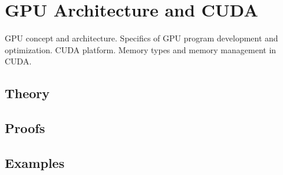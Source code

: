 
\section{GPU Architecture and CUDA}
\label{sec:1.3.11-gpu-cuda}

\begin{ticket}
GPU concept and architecture. Specifics of GPU program development and optimization. CUDA platform. Memory types and memory management in CUDA.
\end{ticket}

\subsection*{Theory}

\subsection*{Proofs}

\subsection*{Examples}
